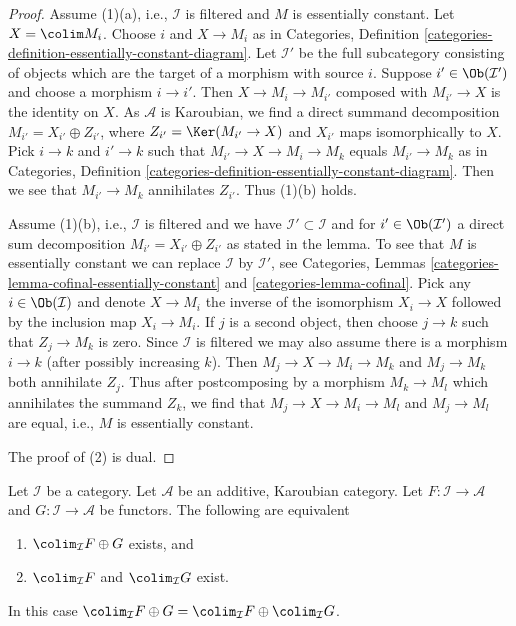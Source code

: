 \begin{proof}
Assume (1)(a), i.e., $\mathcal{I}$ is filtered and $M$ is essentially
constant. Let $X = \colim M_i$. Choose $i$ and $X \to M_i$ as in
Categories, Definition
\ref{categories-definition-essentially-constant-diagram}.
Let $\mathcal{I}'$ be the full subcategory consisting of objects
which are the target of a morphism with source $i$.
Suppose $i' \in \Ob(\mathcal{I}')$ and choose a morphism $i \to i'$.
Then $X \to M_i \to M_{i'}$ composed with $M_{i'} \to X$ is the identity
on $X$. As $\mathcal{A}$ is Karoubian, we find a direct summand
decomposition $M_{i'} = X_{i'} \oplus Z_{i'}$, where
$Z_{i'} = \Ker(M_{i'} \to X)$ and $X_{i'}$ maps isomorphically to $X$.
Pick $i \to k$ and $i' \to k$ such that $M_{i'} \to X \to M_i \to M_k$
equals $M_{i'} \to M_k$ as in Categories, Definition
\ref{categories-definition-essentially-constant-diagram}.
Then we see that $M_{i'} \to M_k$ annihilates $Z_{i'}$.
Thus (1)(b) holds.

\medskip\noindent
Assume (1)(b), i.e., $\mathcal{I}$ is filtered and we have
$\mathcal{I}' \subset \mathcal{I}$ and for $i' \in \Ob(\mathcal{I}')$
a direct sum decomposition $M_{i'} = X_{i'} \oplus Z_{i'}$
as stated in the lemma. To see that $M$ is essentially constant
we can replace $\mathcal{I}$ by $\mathcal{I}'$, see
Categories, Lemmas \ref{categories-lemma-cofinal-essentially-constant} and
\ref{categories-lemma-cofinal}. Pick any $i \in \Ob(\mathcal{I})$
and denote $X \to M_i$ the inverse of the isomorphism $X_i \to X$
followed by the inclusion map $X_i \to M_i$. If $j$ is
a second object, then choose $j \to k$ such that $Z_j \to M_k$ is
zero. Since $\mathcal{I}$ is filtered we may also assume there is
a morphism $i \to k$ (after possibly increasing $k$). Then
$M_j \to X \to M_i \to M_k$ and $M_j \to M_k$ both annihilate $Z_j$.
Thus after postcomposing by a morphism $M_k \to M_l$ which annihilates
the summand $Z_k$, we find that $M_j \to X \to M_i \to M_l$ and
$M_j \to M_l$ are equal, i.e., $M$ is essentially constant.

\medskip\noindent
The proof of (2) is dual.
\end{proof}

\begin{lemma}
\label{lemma-direct-sum-from-product-colimit}
Let $\mathcal{I}$ be a category. Let $\mathcal{A}$ be an additive, Karoubian
category. Let $F : \mathcal{I} \to \mathcal{A}$ and
$G : \mathcal{I} \to \mathcal{A}$ be functors. The following are equivalent
\begin{enumerate}
\item $\colim_\mathcal{I} F \oplus G$ exists, and
\item $\colim_\mathcal{I} F$ and $\colim_\mathcal{I} G$ exist.
\end{enumerate}
In this case $\colim_\mathcal{I} F \oplus G =
\colim_\mathcal{I} F \oplus \colim_\mathcal{I} G$.
\end{lemma}

